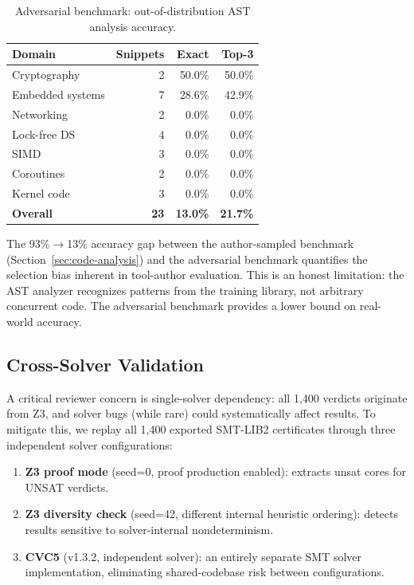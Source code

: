 \documentclass[11pt]{article}
\begin{document}
\begin{table}[ht]
\centering
\caption{Adversarial benchmark: out-of-distribution AST analysis accuracy.}
\label{tab:adversarial}
\small
\begin{tabular}{lrrr}
\toprule
\textbf{Domain} & \textbf{Snippets} & \textbf{Exact} & \textbf{Top-3} \\
\midrule
Cryptography          & 2  & 50.0\% & 50.0\% \\
Embedded systems      & 7  & 28.6\% & 42.9\% \\
Networking            & 2  & 0.0\%  & 0.0\%  \\
Lock-free DS          & 4  & 0.0\%  & 0.0\%  \\
SIMD                  & 3  & 0.0\%  & 0.0\%  \\
Coroutines            & 2  & 0.0\%  & 0.0\%  \\
Kernel code           & 3  & 0.0\%  & 0.0\%  \\
\midrule
\textbf{Overall}      & \textbf{23} & \textbf{13.0\%} & \textbf{21.7\%} \\
\bottomrule
\end{tabular}
\end{table}

\noindent
The 93\%$\to$13\% accuracy gap between the author-sampled benchmark
(Section~\ref{sec:code-analysis}) and the adversarial benchmark
quantifies the selection bias inherent in tool-author evaluation.
This is an honest limitation: the AST analyzer recognizes
patterns from the training library, not arbitrary concurrent code.
The adversarial benchmark provides a lower bound on real-world accuracy.

\subsection{Cross-Solver Validation}
\label{sec:cross-solver}

A critical reviewer concern is single-solver dependency: all
1{,}400 verdicts originate from Z3, and solver bugs (while rare)
could systematically affect results.  To mitigate this, we replay
all 1{,}400 exported SMT-LIB2 certificates through three independent
solver configurations:

\begin{enumerate}[nosep]
\item \textbf{Z3 proof mode} (seed=0, proof production enabled):
  extracts unsat cores for UNSAT verdicts.
\item \textbf{Z3 diversity check} (seed=42, different internal
  heuristic ordering): detects results sensitive to solver-internal
  nondeterminism.
\item \textbf{CVC5} (v1.3.2, independent solver): an entirely
  separate SMT solver implementation, eliminating shared-codebase
  risk between configurations.
\end{enumerate}
\end{document}
